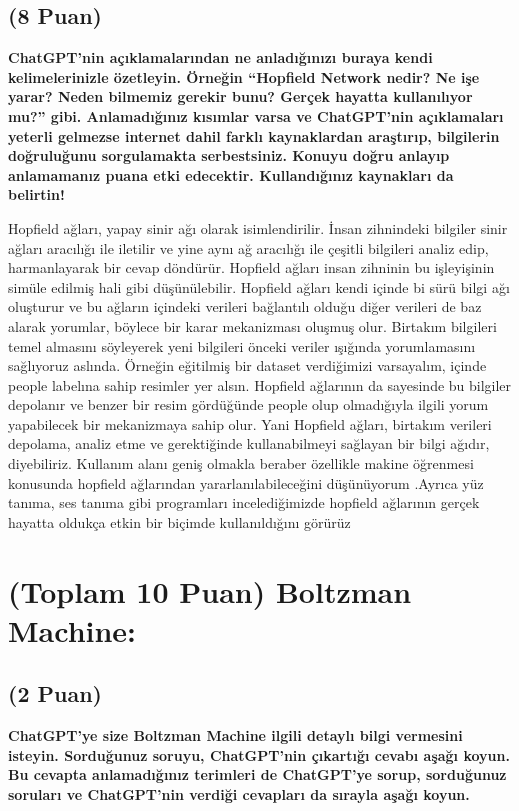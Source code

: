 \documentclass[11pt]{article}
\begin{document}
\subsection{(8 Puan)} \textbf{ChatGPT’nin açıklamalarından ne anladığınızı buraya kendi kelimelerinizle özetleyin. Örneğin ``Hopfield Network nedir? Ne işe yarar? Neden bilmemiz gerekir bunu? Gerçek hayatta kullanılıyor mu?'' gibi. Anlamadığınız kısımlar varsa ve ChatGPT’nin açıklamaları yeterli gelmezse internet dahil farklı kaynaklardan araştırıp, bilgilerin doğruluğunu sorgulamakta serbestsiniz. Konuyu doğru anlayıp anlamamanız puana etki edecektir. Kullandığınız kaynakları da belirtin!}

Hopfield ağları, yapay sinir ağı olarak isimlendirilir. İnsan zihnindeki bilgiler sinir ağları aracılığı ile iletilir ve yine aynı ağ aracılığı ile çeşitli bilgileri analiz edip, harmanlayarak bir cevap döndürür. Hopfield ağları insan zihninin bu işleyişinin simüle edilmiş hali gibi düşünülebilir. Hopfield ağları kendi içinde bi sürü bilgi ağı oluşturur ve bu ağların içindeki verileri bağlantılı olduğu diğer verileri de baz alarak yorumlar, böylece bir karar mekanizması oluşmuş olur. Birtakım bilgileri temel almasını söyleyerek yeni bilgileri önceki veriler ışığında yorumlamasını sağlıyoruz aslında. Örneğin eğitilmiş bir dataset verdiğimizi varsayalım, içinde people labelına sahip resimler yer alsın. Hopfield ağlarının da  sayesinde bu bilgiler depolanır ve benzer bir resim gördüğünde people olup olmadığıyla ilgili yorum yapabilecek bir mekanizmaya sahip olur. Yani Hopfield ağları, birtakım verileri depolama, analiz etme ve gerektiğinde kullanabilmeyi sağlayan bir bilgi ağıdır, diyebiliriz. Kullanım alanı geniş olmakla beraber özellikle makine öğrenmesi konusunda hopfield ağlarından yararlanılabileceğini düşünüyorum .Ayrıca yüz tanıma, ses tanıma gibi programları incelediğimizde hopfield ağlarının gerçek hayatta oldukça etkin bir biçimde kullanıldığını görürüz

\section{(Toplam 10 Puan) Boltzman Machine:}

\subsection{(2 Puan)} \textbf{ChatGPT’ye size Boltzman Machine ilgili detaylı bilgi vermesini isteyin. Sorduğunuz soruyu, ChatGPT'nin çıkartığı cevabı aşağı koyun. Bu cevapta anlamadığınız terimleri de ChatGPT’ye sorup, sorduğunuz soruları ve ChatGPT’nin verdiği cevapları da sırayla aşağı koyun.}
\end{document}
